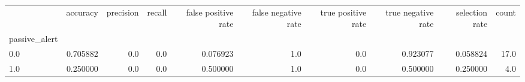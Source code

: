 \begin{tabular}{lrrrrrrrrr}
\toprule
{} &  accuracy &  precision &  recall &  false positive rate &  false negative rate &  true positive rate &  true negative rate &  selection rate &  count \\
passive\_alert &           &            &         &                      &                      &                     &                     &                 &        \\
\midrule
0.0           &  0.705882 &        0.0 &     0.0 &             0.076923 &                  1.0 &                 0.0 &            0.923077 &        0.058824 &   17.0 \\
1.0           &  0.250000 &        0.0 &     0.0 &             0.500000 &                  1.0 &                 0.0 &            0.500000 &        0.250000 &    4.0 \\
\bottomrule
\end{tabular}
